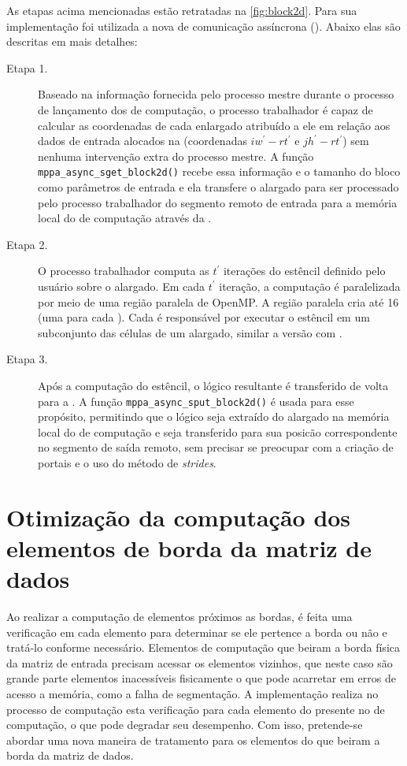As etapas acima mencionadas estão retratadas na \autoref{fig:block2d}. Para sua implementação foi utilizada a nova \api de comunicação assíncrona (\async). Abaixo elas são descritas em mais detalhes:

\begin{description}

	\item[Etapa 1.] Baseado na informação fornecida pelo processo mestre durante o processo de lançamento dos \clusters de computação, o processo trabalhador é capaz de calcular as coordenadas de cada \tile enlargado atribuído a ele em relação aos dados de entrada alocados na \lpddr (coordenadas $iw^\prime - rt^\prime$ e $jh^\prime - rt^\prime$) sem nenhuma intervenção extra do processo mestre. A função \texttt{mppa\_async\_sget\_block2d()} recebe essa informação e o tamanho do bloco como parâmetros de entrada e ela transfere o \tile alargado para ser processado pelo processo trabalhador do segmento remoto de entrada para a memória local do \cluster de computação através da \noc.

	\item[Etapa 2.] O processo trabalhador computa as $t^\prime$ iterações do  estêncil definido pelo usuário sobre o \tile alargado. Em cada $t^\prime$ iteração, a computação é paralelizada por meio de uma região paralela de OpenMP. A região paralela cria até 16 \threads (uma para cada \pe). Cada \pe é responsável por executar o  estêncil em um subconjunto das células de um \tile alargado, similar a versão com \ipc.

	\item[Etapa 3.] Após a computação do  estêncil, o \tile lógico resultante é transferido de volta para a \lpddr. A função \texttt{mppa\_async\_sput\_block2d()} é usada para esse propósito, permitindo que o \tile lógico seja extraído do \tile alargado na memória local do \cluster de computação e seja transferido para sua posicão correspondente no segmento de saída remoto, sem precisar se preocupar com a criação de portais e o uso do método de \textit{strides}.

\end{description}

\section{Otimização da computação dos elementos de borda da matriz de dados}
\label{sec:otimizacao-bordas}

Ao realizar a computação de elementos próximos as bordas, é feita uma verificação em cada elemento para determinar se ele pertence a borda ou não e tratá-lo conforme necessário. Elementos de computação que beiram a borda física da matriz de entrada precisam acessar os elementos vizinhos, que neste caso são grande parte elementos inacessíveis fisicamente o que pode acarretar em erros de acesso a memória, como a falha de segmentação. A implementação \ipc realiza no processo de computação esta verificação para cada elemento do \tile presente no \cluster de computação, o que pode degradar seu desempenho. Com isso, pretende-se abordar uma nova maneira de tratamento para os elementos do \tile que beiram a borda da matriz de dados. 

